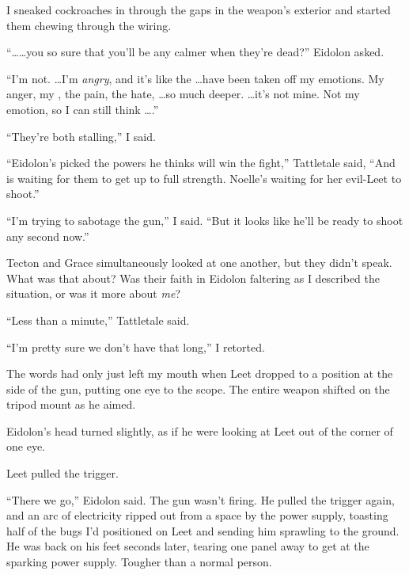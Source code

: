 I sneaked cockroaches in through the gaps in the weapon's exterior and started them chewing through the wiring.



``\ldots \ldots you so sure that you'll be any calmer when they're dead?'' Eidolon asked.



``I'm not.  \ldots I'm \emph{angry}, and it's like the \ldots have been taken off my emotions.  My anger, my \ldotstion, the pain, the hate, \ldots so much deeper.  \ldots it's not mine.  Not my emotion, so I can still think \ldots .''



``They're both stalling,'' I said.



``Eidolon's picked the powers he thinks will win the fight,'' Tattletale said, ``And is waiting for them to get up to full strength.  Noelle's waiting for her evil-Leet to shoot.''



``I'm trying to sabotage the gun,'' I said.  ``But it looks like he'll be ready to shoot any second now.''



Tecton and Grace simultaneously looked at one another, but they didn't speak.  What was that about?  Was their faith in Eidolon faltering as I described the situation, or was it more about \emph{me}?



``Less than a minute,'' Tattletale said.



``I'm pretty sure we don't have that long,'' I retorted.



The words had only just left my mouth when Leet dropped to a position at the side of the gun, putting one eye to the scope.  The entire weapon shifted on the tripod mount as he aimed.



Eidolon's head turned slightly, as if he were looking at Leet out of the corner of one eye.



Leet pulled the trigger.



``There we go,'' Eidolon said.  The gun wasn't firing.  He pulled the trigger again, and an arc of electricity ripped out from a space by the power supply, toasting half of the bugs I'd positioned on Leet and sending him sprawling to the ground.  He was back on his feet seconds later, tearing one panel away to get at the sparking power supply.  Tougher than a normal person.



